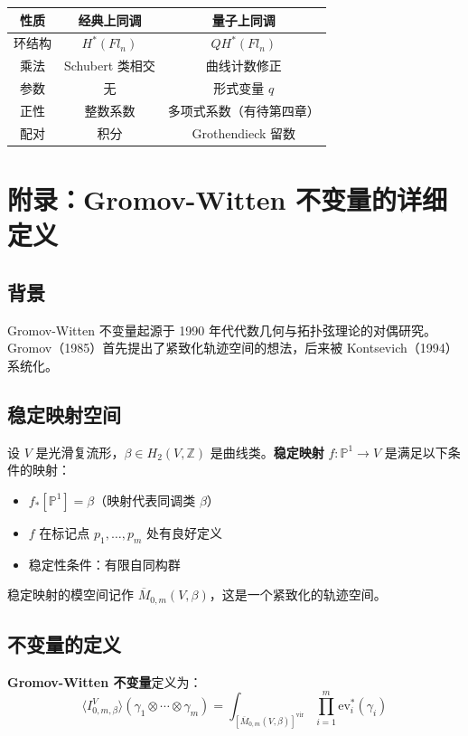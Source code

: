 \begin{center}
\begin{tabular}{c|c|c}
性质 & 经典上同调 & 量子上同调 \\ \hline
环结构 & $H^*(Fl_n)$ & $QH^*(Fl_n)$ \\
乘法 & Schubert 类相交 & 曲线计数修正 \\
参数 & 无 & 形式变量 $q$ \\
正性 & 整数系数 & 多项式系数（有待第四章）\\
配对 & 积分 & Grothendieck 留数
\end{tabular}
\end{center}

\section{附录：Gromov-Witten 不变量的详细定义}
\label{sec:GW-invariant-detailed}

\subsection*{背景}

Gromov-Witten 不变量起源于 1990 年代代数几何与拓扑弦理论的对偶研究。Gromov（1985）首先提出了紧致化轨迹空间的想法，后来被 Kontsevich（1994）系统化。

\subsection*{稳定映射空间}

设 $V$ 是光滑复流形，$\beta \in H_2(V, \mathbb{Z})$ 是曲线类。\textbf{稳定映射} $f: \mathbb{P}^1 \to V$ 是满足以下条件的映射：
\begin{itemize}
\item $f_*[\mathbb{P}^1] = \beta$（映射代表同调类 $\beta$）
\item $f$ 在标记点 $p_1, \ldots, p_m$ 处有良好定义
\item 稳定性条件：有限自同构群
\end{itemize}

稳定映射的模空间记作 $\overline{M}_{0,m}(V, \beta)$，这是一个紧致化的轨迹空间。

\subsection*{不变量的定义}

\textbf{Gromov-Witten 不变量}定义为：
$$\langle I_{0,m,\beta}^V \rangle(\gamma_1 \otimes \cdots \otimes \gamma_m) = \int_{[\overline{M}_{0,m}(V,\beta)]^{\text{vir}}} \prod_{i=1}^m \text{ev}_i^*(\gamma_i)$$

